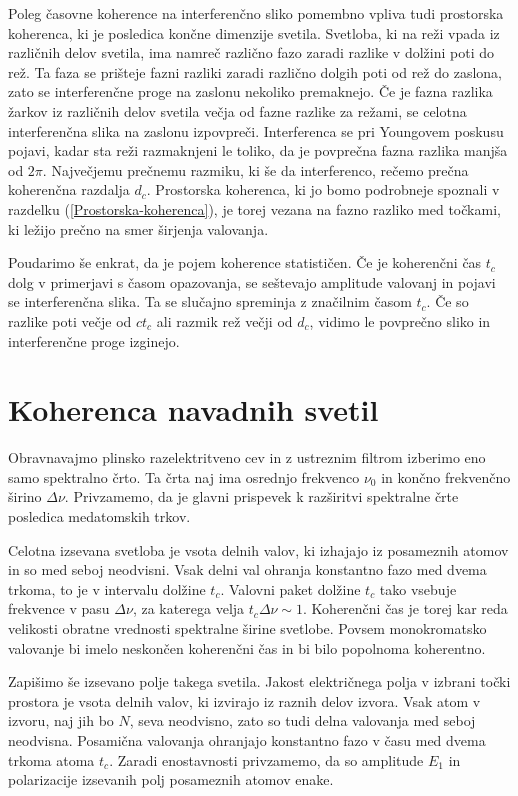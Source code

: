 Poleg časovne koherence na interferenčno sliko pomembno vpliva tudi
prostorska koherenca, ki je posledica
končne dimenzije svetila. Svetloba, ki na reži vpada iz različnih delov
svetila, ima namreč različno fazo zaradi razlike v dolžini poti 
do rež. Ta faza se prišteje fazni razliki zaradi različno dolgih poti 
od rež do zaslona, zato se interferenčne proge na zaslonu nekoliko 
premaknejo. Če je fazna razlika žarkov iz različnih
delov svetila večja od fazne razlike za režami, se celotna interferenčna
slika na zaslonu izpovpreči. Interferenca se pri Youngovem poskusu
pojavi, kadar sta reži razmaknjeni le toliko, da je povprečna fazna
razlika manjša od $2\pi$. Največjemu prečnemu razmiku, ki še da interferenco,
rečemo prečna koherenčna razdalja $d_{c}$. 
Prostorska koherenca, ki jo bomo podrobneje spoznali v razdelku 
(\ref{Prostorska-koherenca}),
je torej vezana na fazno razliko med točkami, ki ležijo prečno 
na smer širjenja valovanja.

Poudarimo še enkrat, da je pojem koherence statističen.
Če je koherenčni čas $t_{c}$ dolg v primerjavi s časom opazovanja,
se seštevajo amplitude valovanj in pojavi se interferenčna slika.
Ta se slučajno spreminja z značilnim časom $t_{c}$. Če so razlike
poti večje od $ct_{c}$ ali razmik rež večji od $d_{c}$, vidimo
le povprečno sliko in interferenčne proge izginejo.

\section{Koherenca navadnih svetil}
\label{chap:kns}
Obravnavajmo plinsko razelektritveno cev in z
ustreznim filtrom izberimo eno samo spektralno črto. Ta črta naj ima
osrednjo frekvenco $\nu_{0}$ in končno frekvenčno širino $\Delta\nu$.
Privzamemo, da je glavni prispevek k razširitvi spektralne črte posledica
medatomskih trkov.

Celotna izsevana svetloba je vsota delnih valov, ki izhajajo iz posameznih
atomov in so med seboj neodvisni. Vsak delni val ohranja konstantno fazo
med dvema trkoma, to je v intervalu dolžine $t_{c}$. Valovni paket dolžine 
$t_{c}$ tako vsebuje frekvence v pasu $\Delta \nu$,
za katerega velja $t_{c}\Delta\nu\sim1$. Koherenčni čas je torej
kar reda velikosti obratne vrednosti spektralne širine svetlobe. Povsem
monokromatsko valovanje bi imelo neskončen koherenčni čas in bi bilo
popolnoma koherentno.

Zapišimo še izsevano polje takega svetila. 
Jakost električnega polja v izbrani točki prostora je vsota delnih
valov, ki izvirajo iz raznih delov izvora. Vsak atom v izvoru, naj
jih bo $N$, seva neodvisno, zato so tudi delna valovanja med seboj
neodvisna. Posamična valovanja ohranjajo konstantno fazo v času med
dvema trkoma atoma $t_{c}$. Zaradi enostavnosti privzamemo,
da so amplitude $E_{1}$ in polarizacije izsevanih polj posameznih atomov enake. 


